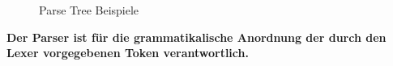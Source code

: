 \begin{figure}[h]
    \centering
    \qquad
    \caption{Parse Tree Beispiele}
    \label{fig:Aufgabe2a_parseTree}
\end{figure}
\newline

\textbf{Der Parser ist für die grammatikalische Anordnung der durch den Lexer vorgegebenen Token verantwortlich.}
\newpage